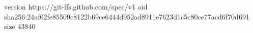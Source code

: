 version https://git-lfs.github.com/spec/v1
oid sha256:24af02fe85509c8122b69ce6444d952ad8911e7623d1c5c80ce77acd6f70d691
size 43840
